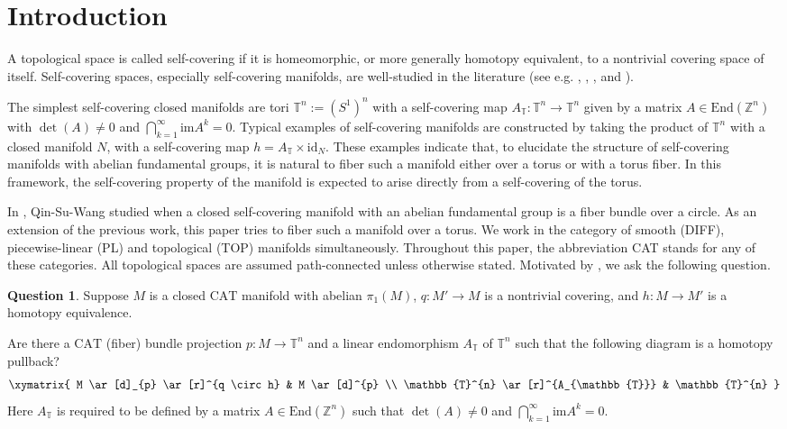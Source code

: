 \documentclass[12pt]{amsart}
\theoremstyle{plain}
\theoremstyle{definition}
\theoremstyle{question}
\newtheorem{question}[theorem]{Question}
\theoremstyle{remark}
\theoremstyle{assumption}
\numberwithin{equation}{section}
\theoremstyle{bigthm}
\begin{document}
\section{Introduction}\label{sec_introduction}
A topological space is called self-covering if it is homeomorphic, or more generally homotopy equivalent, to a nontrivial covering space of itself. Self-covering spaces, especially self-covering manifolds, are well-studied in the literature (see e.g. \cite{BDT}, \cite{Dekimpe}, \cite{Dere17}, \cite{VanLimbeek} and \cite{Wang_Wu}).

The simplest self-covering closed manifolds are tori $\mathbb{T}^{n} := (S^{1})^{n}$ with a self-covering map $A_{\mathbb{T}} \colon  \mathbb{T}^{n} \rightarrow \mathbb{T}^{n}$ given by a matrix $A \in \mathrm{End} (\mathbb{Z}^{n})$ with $\det (A) \ne 0$ and $\bigcap_{k=1}^{\infty} \mathrm{im} A^{k} =0$. Typical examples of self-covering manifolds are constructed by taking the product of $\mathbb{T}^n$ with a closed manifold $N$, with a self-covering map $h = A_{\mathbb{T}} \times \mathrm{id}_N$. These examples indicate that, to elucidate the structure of self-covering manifolds with abelian fundamental groups, it is natural to fiber such a manifold either over a torus or with a torus fiber. In this framework, the self-covering property of the manifold is expected to arise directly from a self-covering of the torus.

In \cite{Qin_Su_Wang}, Qin-Su-Wang studied when a closed self-covering manifold with an abelian fundamental group is a fiber bundle over a circle. As an extension of the previous work, this paper tries to fiber such a manifold over a torus. We work in the category of smooth (DIFF), piecewise-linear (PL) and topological (TOP) manifolds simultaneously. Throughout this paper, the abbreviation CAT stands for any of these categories. All topological spaces are assumed path-connected unless otherwise stated. Motivated by \cite{Qin_Su_Wang}, we ask the following question.

\begin{question}\label{que_abelian}
Suppose $M$ is a closed $\mathrm{CAT}$ manifold with abelian $\pi_{1} (M)$, $q \colon  M' \rightarrow M$ is a nontrivial covering, and $h \colon  M \rightarrow M'$ is a homotopy equivalence.

Are there a $\mathrm{CAT}$ (fiber) bundle projection $p \colon  M \rightarrow \mathbb{T}^{n}$ and a linear endomorphism $A_{\mathbb{T}}$ of $\mathbb{T}^{n}$ such that the following diagram is a homotopy pullback?
\begin{equation}\label{que_abelian_1}
\xymatrix{
  M \ar[d]_{p} \ar[r]^{q \circ h} & M \ar[d]^{p} \\
  \mathbb{T}^{n} \ar[r]^{A_{\mathbb{T}}} & \mathbb{T}^{n}   }
\end{equation}
Here $A_{\mathbb{T}}$ is required to be defined by a matrix $A \in \mathrm{End} (\mathbb{Z}^{n})$ such that $\det (A) \neq 0$ and $\bigcap_{k=1}^{\infty} \mathrm{im} A^{k} =0$.
\end{question}
\end{document}
